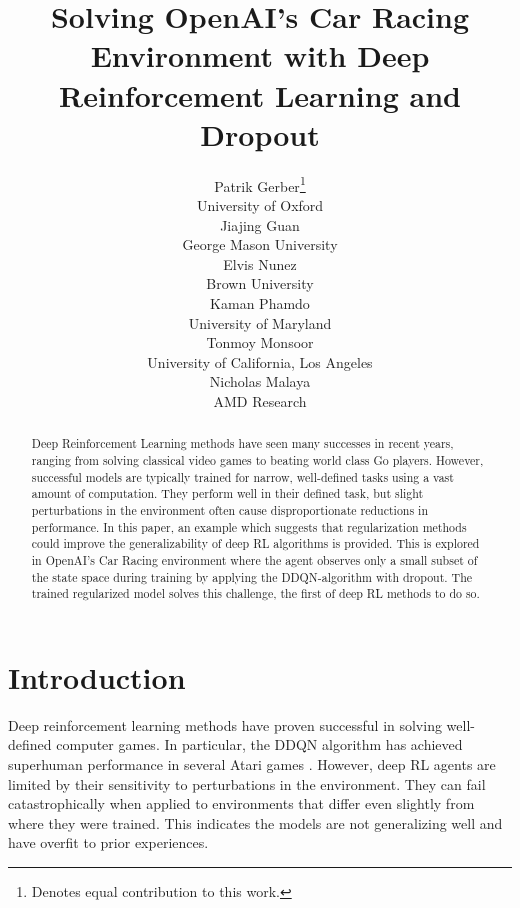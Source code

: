\documentclass{article}
\title{Solving OpenAI's Car Racing Environment with Deep Reinforcement Learning and Dropout}
\author{
  Patrik Gerber\thanks{Denotes equal contribution to this work.}\\
  University of Oxford \\
  \And
  Jiajing Guan\samethanks \\
  George Mason University \\ 
  \And
  Elvis Nunez\samethanks \\
  Brown University \\
  \And
  Kaman Phamdo\samethanks \\
  University of Maryland \\
  \And
  Tonmoy Monsoor \\
  University of California, Los Angeles \\
  \And
  Nicholas Malaya \\ %
  AMD Research \\ 
}
\begin{document}

\maketitle

\begin{abstract}

  


  
Deep Reinforcement Learning methods have seen many successes in recent
years, ranging from solving classical video games to beating world
class Go players. However, successful models are typically trained for
narrow, well-defined tasks using a vast amount of computation. They
perform well in their defined task, but slight perturbations in the
environment often cause disproportionate reductions in performance. In
this paper, an example which suggests that regularization
methods could improve the generalizability of deep RL algorithms is
provided.
This is explored in OpenAI’s Car Racing environment where the agent
observes only a small subset of the state space during training by
applying the DDQN-algorithm with dropout.  The trained regularized
model solves this challenge, the first of deep RL methods to do so.
\end{abstract}

\vspace{-4mm}
\section{Introduction}
Deep reinforcement learning methods have proven successful in solving
well-defined computer games. In particular, the DDQN algorithm has
achieved superhuman performance in several Atari games
\cite{DQN}. However, deep RL agents are limited by their sensitivity
to perturbations in the environment. They can fail catastrophically
when applied to environments that differ even slightly from where they
were trained. This indicates the models
are not generalizing well and have overfit to prior experiences. 
\end{document}
